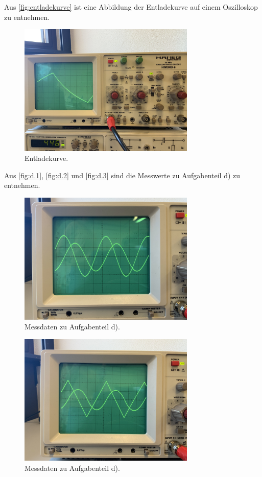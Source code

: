 Aus \autoref{fig:entladekurve} ist eine Abbildung der Entladekurve auf einem Oszilloskop zu entnehmen.
\begin{figure}
    \centering
    \includegraphics[width=0.75\textwidth]{Dateien/entladekurve.jpeg}
    \caption{Entladekurve.}
    \label{fig:entladekurve}
\end{figure}

Aus \autoref{fig:d.1}, \autoref{fig:d.2} und \autoref{fig:d.3} sind die Messwerte zu Aufgabenteil d) zu entnehmen.
\begin{figure}
    \centering
    \includegraphics[width=0.75\textwidth]{Dateien/d.1.jpeg}
    \caption{Messdaten zu Aufgabenteil d).}
    \label{fig:d.1}
\end{figure}

\begin{figure}
    \centering
    \includegraphics[width=0.75\textwidth]{Dateien/d.2.jpeg}
    \caption{Messdaten zu Aufgabenteil d).}
    \label{fig:d.2}
\end{figure}

